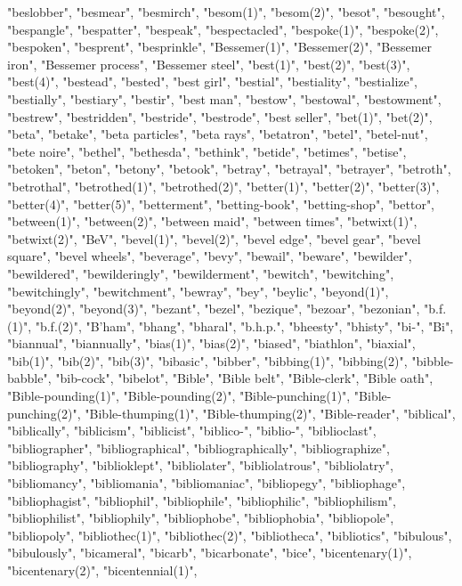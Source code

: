 "beslobber",
"besmear",
"besmirch",
"besom(1)",
"besom(2)",
"besot",
"besought",
"bespangle",
"bespatter",
"bespeak",
"bespectacled",
"bespoke(1)",
"bespoke(2)",
"bespoken",
"besprent",
"besprinkle",
"Bessemer(1)",
"Bessemer(2)",
"Bessemer iron",
"Bessemer process",
"Bessemer steel",
"best(1)",
"best(2)",
"best(3)",
"best(4)",
"bestead",
"bested",
"best girl",
"bestial",
"bestiality",
"bestialize",
"bestially",
"bestiary",
"bestir",
"best man",
"bestow",
"bestowal",
"bestowment",
"bestrew",
"bestridden",
"bestride",
"bestrode",
"best seller",
"bet(1)",
"bet(2)",
"beta",
"betake",
"beta particles",
"beta rays",
"betatron",
"betel",
"betel-nut",
"bete noire",
"bethel",
"bethesda",
"bethink",
"betide",
"betimes",
"betise",
"betoken",
"beton",
"betony",
"betook",
"betray",
"betrayal",
"betrayer",
"betroth",
"betrothal",
"betrothed(1)",
"betrothed(2)",
"better(1)",
"better(2)",
"better(3)",
"better(4)",
"better(5)",
"betterment",
"betting-book",
"betting-shop",
"bettor",
"between(1)",
"between(2)",
"between maid",
"between times",
"betwixt(1)",
"betwixt(2)",
"BeV",
"bevel(1)",
"bevel(2)",
"bevel edge",
"bevel gear",
"bevel square",
"bevel wheels",
"beverage",
"bevy",
"bewail",
"beware",
"bewilder",
"bewildered",
"bewilderingly",
"bewilderment",
"bewitch",
"bewitching",
"bewitchingly",
"bewitchment",
"bewray",
"bey",
"beylic",
"beyond(1)",
"beyond(2)",
"beyond(3)",
"bezant",
"bezel",
"bezique",
"bezoar",
"bezonian",
"b.f.(1)",
"b.f.(2)",
"B'ham",
"bhang",
"bharal",
"b.h.p.",
"bheesty",
"bhisty",
"bi-",
"Bi",
"biannual",
"biannually",
"bias(1)",
"bias(2)",
"biased",
"biathlon",
"biaxial",
"bib(1)",
"bib(2)",
"bib(3)",
"bibasic",
"bibber",
"bibbing(1)",
"bibbing(2)",
"bibble-babble",
"bib-cock",
"bibelot",
"Bible",
"Bible belt",
"Bible-clerk",
"Bible oath",
"Bible-pounding(1)",
"Bible-pounding(2)",
"Bible-punching(1)",
"Bible-punching(2)",
"Bible-thumping(1)",
"Bible-thumping(2)",
"Bible-reader",
"biblical",
"biblically",
"biblicism",
"biblicist",
"biblico-",
"biblio-",
"biblioclast",
"bibliographer",
"bibliographical",
"bibliographically",
"bibliographize",
"bibliography",
"biblioklept",
"bibliolater",
"bibliolatrous",
"bibliolatry",
"bibliomancy",
"bibliomania",
"bibliomaniac",
"bibliopegy",
"bibliophage",
"bibliophagist",
"bibliophil",
"bibliophile",
"bibliophilic",
"bibliophilism",
"bibliophilist",
"bibliophily",
"bibliophobe",
"bibliophobia",
"bibliopole",
"bibliopoly",
"bibliothec(1)",
"bibliothec(2)",
"bibliotheca",
"bibliotics",
"bibulous",
"bibulously",
"bicameral",
"bicarb",
"bicarbonate",
"bice",
"bicentenary(1)",
"bicentenary(2)",
"bicentennial(1)",
